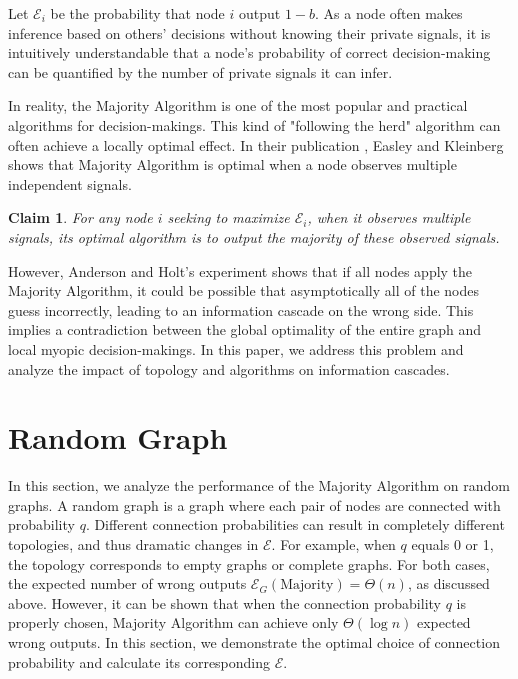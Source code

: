 \documentclass[a4paper,UKenglish]{lipics}
\newtheorem{clm}[thm]{Claim}
\theoremstyle{definition}
\begin{document}
Let $\mathcal{E}_i$ be the probability that node $i$ output $1 - b$. 
As a node often makes inference based on others' decisions without knowing their private signals, 
	it is intuitively understandable that a node's probability of correct decision-making can be quantified by the number of private signals it can infer.

In reality, the Majority Algorithm is one of the most popular and practical algorithms for decision-makings. 
This kind of "following the herd" algorithm can often achieve a locally optimal effect. 
In their publication \cite{Easley Book}, Easley and Kleinberg shows that Majority Algorithm is optimal when a node observes multiple independent signals.
\begin{clm}
	\label{clm:multiple is optimal}
	For any node $i$ seeking to maximize $\mathcal{E}_i$, 
		when it observes multiple signals, its optimal algorithm is to output the majority of these observed signals.
\end{clm}

However, Anderson and Holt's experiment shows that if all nodes apply the Majority Algorithm, 
	it could be possible that asymptotically all of the nodes guess incorrectly, 
	leading to an information cascade on the wrong side. 
This implies a contradiction between the global optimality of the entire graph and local myopic decision-makings.
In this paper, we address this problem and analyze the impact of topology and algorithms on information cascades.









\section{Random Graph}
In this section, we analyze the performance of the Majority Algorithm on random graphs.
A random graph is a graph where each pair of nodes are connected with probability $q$.
Different connection probabilities can result in completely different topologies, and thus dramatic changes in $\mathcal{E}$.
For example, when $q$ equals 0 or 1, the topology corresponds to empty graphs or complete graphs.
For both cases, the expected number of wrong outputs $\mathcal{E}_G(\text{Majority}) = \Theta(n)$, as discussed above.
However, it can be shown that when the connection probability $q$ is properly chosen, 
	Majority Algorithm can achieve only $\Theta(\log n)$ expected wrong outputs.
In this section, we demonstrate the optimal choice of connection probability
	and calculate its corresponding $\mathcal{E}$.
	
\end{document}
